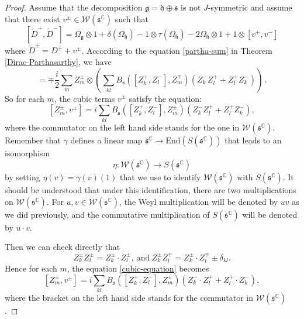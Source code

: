\documentclass[10pt,a4paper]{amsart}
\newcommand{\mg}{\mathfrak{g}}
\newcommand{\mh}{\mathfrak{h}}
\newcommand{\ms}{\mathfrak{s}}
\newcommand{\weyl}{\mathcal{W}(\ms^\mathbb{C})}
\begin{document}
\begin{proof}

Assume that the decomposition $\mg= \mh \oplus \ms$ is not $J$-symmetric and assume that there exist   $v^\pm \in \weyl$ such that
$$
[\tilde{D}^+,\tilde{D}^-] = 
\Omega_{\mg}\otimes 1 + \delta(\Omega_{\mh})-1\otimes \tau(\Omega_{\mh})- 2\Omega_\mh \otimes 1+ 1\otimes [v^+,v^-]
$$ 
where $\tilde{D}^\pm = D^\pm + v^\pm$.
According to the  equation \eqref{partha-sum} in Theorem \ref{Dirac-Parthasarthy}, we have
\begin{equation*}
[D^\pm,1\otimes v^\mp]=\mp
\frac{i}2\sum_{m}
Z_m^\pm \otimes \left( \sum_{kl} 
B_\ms([Z_k^+,Z_l^-],Z_m^\mp)
(Z_k^-Z_l^+ + Z_l^+Z_k^-) \right)\,.
\end{equation*}
So for each $m$, the cubic terms $v^\pm$  satisfy
the equation:
\begin{equation} 
\label{cubic-equation}  
[Z_m^\pm,v^\pm] =
i\sum_{kl} 
B_\ms([Z_k^+,Z_l^-],Z_m^\pm)
(Z_k^-Z_l^+ + Z_l^+Z_k^-),
\end{equation}
where the commutator on the left hand side stands for the one in $\weyl$.\\ Remember that $\gamma$ defines a linear map $\ms^\mathbb{C} \to \text{End}  (S(\ms^\mathbb{C}))$ that leads to an  
isomorphism 
$$\eta : \weyl \to S(\ms^\mathbb{C})$$ 
by setting $\eta(v)=\gamma(v)(1)$ that we use to identify $\weyl$ with  $S(\ms^\mathbb{C})$.
It should be understood that under this identification, there are two multiplications on $\weyl$.  For $u, v  \in  \weyl $, 
the Weyl multiplication will be denoted by $uv$ as we did previously, and the commutative multiplication of $S(\ms^\mathbb{C})$  will be denoted by $u\cdot v$.

Then we can check directly that 
\begin{equation} 
\label{weyl-sym}  
Z_k^\pm Z_l^\pm=Z_k^\pm \cdot Z_l^\pm, \ \text{and}  \   Z_k^\pm Z_l^\mp=Z_k^\pm \cdot Z_l^\mp \pm \delta_{kl}.
\end{equation} 
Hence for each $m$, the equation  \eqref{cubic-equation} becomes 
\begin{equation} 
\label{cubic-equation-sym}  
[Z_m^\pm,v^\pm] =
i\sum_{kl} 
B_\ms([Z_k^+,Z_l^-],Z_m^\pm)
(Z_k^-\cdot Z_l^+ + Z_l^+\cdot Z_k^-),
\end{equation} 
where the bracket on the left hand side stands for the commutator in $\weyl$.


\end{proof}
\end{document}
